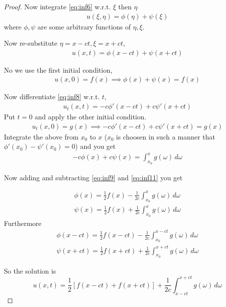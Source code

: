 \documentclass[oneside,11pt,pdftex,final]{book}%
\numberwithin{equation}{section}
\numberwithin{section}{chapter}
\numberwithin{equation}{chapter}
\begin{document}
\begin{proof}
	Now integrate \ref{eq:inf6} w.r.t. $ \xi  $ then $ \eta $
	\begin{align}\label{eq:inf7}
		 u(\xi, \eta)=\phi(\eta)+\psi(\xi) 
	 \end{align}
	where $ \phi, \psi $ are some arbitrary functions of $ \eta , \xi$.
	
	Now re-substitute $ \eta=x-ct, \xi=x+ct $,
	\begin{align}\label{eq:inf8}
		u(x,t)=\phi(x-ct)+\psi(x+ct)
	\end{align}
	
	No we use the first initial condition,
	\begin{align}\label{eq:inf9}
		 u(x,0)=f(x)\implies \phi(x)+\psi(x)=f(x)
	\end{align}
	
	Now differentiate \ref{eq:inf8} w.r.t. $t$,
	\begin{align*}
		u_t(x,t)=-c\phi'(x-ct)+c\psi'(x+ct)
	\end{align*}   Put $ t=0 $ and apply the other initial condition.
	\begin{align}\label{eq:inf10}
		u_t(x,0) =g(x)\implies -c\phi'(x-ct)+c\psi'(x+ct)=g(x)
	\end{align}
	Integrate the above from $ x_0 $ to $ x $ ($ x_0 $ is choosen in such a manner that $ \phi'(x_0)-\psi'(x_0)=0 $) and you get 
	\begin{align}\label{eq:inf11}
		-c\phi(x)+c\psi(x)=\int_{x_0}^{x}g(\omega)\, d\omega
	\end{align} 
	
	Now adding and subtracting \ref{eq:inf9} and \ref{eq:inf11} you get
	
	\begin{align*}
		\phi(x)=\frac{1}{2}f(x)-\frac{1}{2c}\int_{x_0}^x g(\omega)\, d\omega \\
		\psi(x)=\frac{1}{2}f(x)+\frac{1}{2c}\int_{x_0}^x g(\omega)\, d\omega
	\end{align*}
	Furthermore
	\begin{align*}
		\phi(x-ct)=\frac{1}{2}f(x-ct)-\frac{1}{2c}\int_{x_0}^{x-ct} g(\omega)\, d\omega \\
		\psi(x+ct)=\frac{1}{2}f(x+ct)+\frac{1}{2c}\int_{x_0}^{x+ct} g(\omega)\, d\omega
	\end{align*}

So the solution is 
\[ u(x,t)=\frac{1}{2}[f(x-ct)+f(x+ct)]+\frac{1}{2c}\int_{x-ct}^{x+ct}g(\omega)\, d \omega \]
\end{proof}
\end{document}
